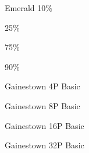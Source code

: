 \documentclass{article}
\theoremstyle{remark}
\theoremstyle{remark}
\begin{document}
\begin{figure*}
Emerald 10\%


25\%


75\%


90\%

\end{figure*}



\begin{table*}
Gainestown 4P Basic



Gainestown 8P Basic



Gainestown 16P Basic



Gainestown 32P Basic


\end{table*}


\end{document}
